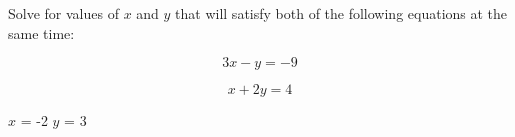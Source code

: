 

Solve for values of $x$ and $y$ that will satisfy both of the following equations at the same time:

$$3x - y = -9$$

$$x + 2y = 4$$







$x$ = -2 \hskip 50pt $y$ = 3











